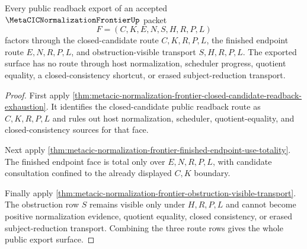\begin{theorem}
\label{thm:metacic-normalization-frontier-route-readback-public-export}
Every public readback export of an accepted $\MetaCICNormalizationFrontierUp$
packet
$$
F=(C,K,E,N,S,H,R,P,L)
$$
factors through the closed-candidate route $C,K,R,P,L$, the finished endpoint
route $E,N,R,P,L$, and obstruction-visible transport $S,H,R,P,L$. The exported
surface has no route through host normalization, scheduler progress, quotient
equality, a closed-consistency shortcut, or erased subject-reduction transport.
\end{theorem}
\begin{proof}
First apply
\autoref{thm:metacic-normalization-frontier-closed-candidate-readback-exhaustion}.
It identifies the closed-candidate public readback route as $C,K,R,P,L$ and
rules out host normalization, scheduler, quotient-equality, and
closed-consistency sources for that face.

Next apply
\autoref{thm:metacic-normalization-frontier-finished-endpoint-use-totality}.
The finished endpoint face is total only over $E,N,R,P,L$, with candidate
consultation confined to the already displayed $C,K$ boundary.

Finally apply
\autoref{thm:metacic-normalization-frontier-obstruction-visible-transport}.
The obstruction row $S$ remains visible only under $H,R,P,L$ and cannot become
positive normalization evidence, quotient equality, closed consistency, or
erased subject-reduction transport. Combining the three route rows gives the
whole public export surface.
\end{proof}
